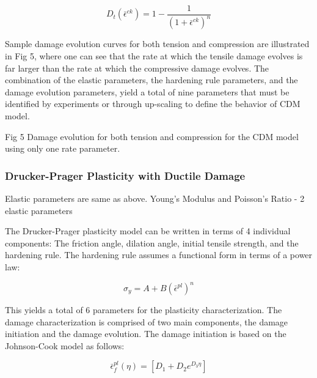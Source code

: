 \begin{equation}
D_{t}\left(\bar{\epsilon}^{ck}\right)=1-\frac{1}{\left(1+\bar{\epsilon}^{ck}\right)^{n}}\label{eqn:param4}
\end{equation}


Sample damage evolution curves for both tension and compression are
illustrated in Fig 5, where one can see that the rate at which the
tensile damage evolves is far larger than the rate at which the compressive
damage evolves. The combination of the elastic parameters, the hardening
rule parameters, and the damage evolution parameters, yield a total
of nine parameters that must be identified by experiments or through
up-scaling to define the behavior of CDM model.

Fig 5 Damage evolution for both tension and compression for the CDM
model using only one rate parameter.


\subsubsection{Drucker-Prager Plasticity with Ductile Damage}

Elastic parameters are same as above. Young's Modulus and Poisson's
Ratio - 2 elastic parameters

The Drucker-Prager plasticity model can be written in terms of 4 individual
components: The friction angle, dilation angle, initial tensile strength,
and the hardening rule. The hardening rule assumes a functional form
in terms of a power law:

\begin{equation}
\sigma_{y}=A+B\left(\bar{\epsilon}^{pl}\right)^{n}\label{eqn:param5}
\end{equation}


This yields a total of 6 parameters for the plasticity characterization.
The damage characterization is comprised of two main components,
the damage initiation and the damage evolution. The damage initiation
is based on the Johnson-Cook model as follows: 

\begin{equation}
\bar{\epsilon}_{f}^{pl}\left(\eta\right)=\left[D_{1}+D_{2}e^{D_{3}\eta}\right]\label{eqn:param6}
\end{equation}


